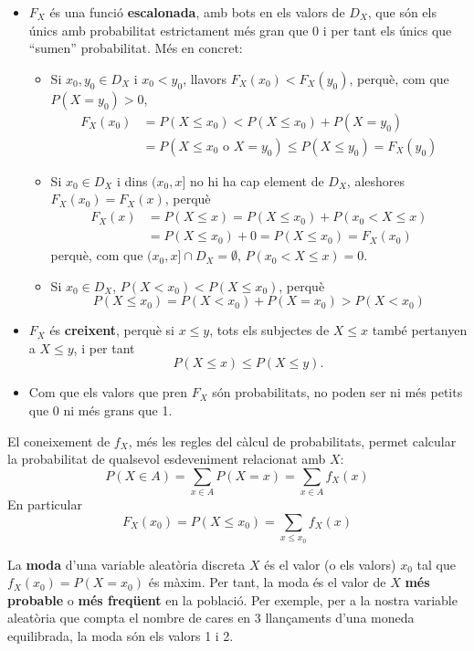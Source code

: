\documentclass[
]{book}
\renewcommand{\leq}{\leqslant}
\theoremstyle{definition}
\theoremstyle{definition}
\theoremstyle{definition}
\theoremstyle{remark}
\begin{document}
\begin{itemize}
\item
  \(F_X\) és una funció \textbf{escalonada}, amb bots en els valors de \(D_X\), que són els únics amb probabilitat estrictament més gran que 0 i per tant els únics que ``sumen'' probabilitat. Més en concret:

  \begin{itemize}
  \item
    Si \(x_0,y_0\in D_X\) i \(x_0<y_0\), llavors \(F_X(x_0)< F_X(y_0)\), perquè, com que \(P(X=y_0)>0\),
    \[
    \begin{array}{rl}
    F_X(x_0)\!\!\!\!\! & =P(X\leq x_0)<P(X\leq x_0)+P(X=y_0)\\
    & =P(X\leq x_0\text{ o }X=y_0)\leq P(X\leq y_0)=F_X(y_0)
    \end{array}
    \]
  \item
    Si \(x_0\in D_X\) i dins \((x_0,x]\) no hi ha cap element de \(D_X\), aleshores \(F_X(x_0)=F_X(x)\), perquè
    \[
    \begin{array}{rl}
    F_X(x)\!\!\!\!\! & =P(X\leq x)=P(X\leq x_0)+P(x_0<X\leq x)\\
    & =P(X\leq x_0)+0= P(X\leq x_0)=F_X(x_0)
    \end{array}
    \]
    perquè, com que \((x_0,x]\cap D_X=\emptyset\), \(P(x_0<X\leq x)=0\).
  \item
    Si \(x_0\in D_X\), \(P(X<x_0)<P(X\leq x_0)\), perquè
    \[
    P(X\leq x_0)=P(X<x_0)+P(X=x_0)>P(X<x_0)
    \]
  \end{itemize}
\item
  \(F_X\) és \textbf{creixent}, perquè si \(x\leq y\), tots els subjectes de \(X\leq x\) també pertanyen a \(X\leq y\), i per tant
  \[
  P(X\leq x)\leq P(X\leq y).
  \]
\item
  Com que els valors que pren \(F_X\) són probabilitats, no poden ser ni més petits que 0 ni més grans que 1.
\end{itemize}

El coneixement de \(f_X\), més les regles del càlcul de probabilitats, permet calcular la probabilitat de qualsevol esdeveniment relacionat amb \(X\):
\[
P(X\in A) =\sum_{x\in A} P(X=x) = \sum_{x\in A} f_X(x)
\]
En particular
\[
F_X(x_0)=P(X\leq x_0)=\sum_{x\leq x_0} f_X(x)
\]

La \textbf{moda} d'una variable aleatòria discreta \(X\) és el valor (o els valors) \(x_0\) tal que \(f_X(x_0)=P(X=x_0)\) és màxim. Per tant, la moda és el valor de \(X\) \textbf{més probable} o \textbf{més freqüent} en la població. Per exemple, per a la nostra variable aleatòria que compta el nombre de cares en 3 llançaments d'una moneda equilibrada, la moda són els valors 1 i 2.
\end{document}
